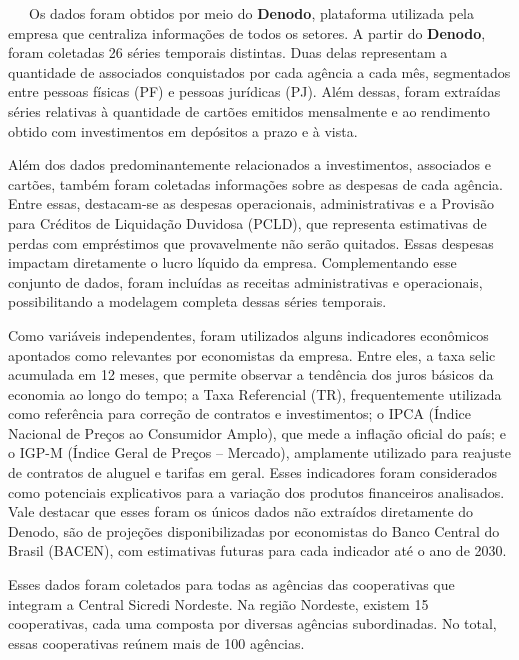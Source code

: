 \documentclass[
  12pt,
  a4paper,
]{scrreprt}
\begin{document}
~~~Os dados foram obtidos por meio do \textbf{Denodo}, plataforma
utilizada pela empresa que centraliza informações de todos os setores. A
partir do \textbf{Denodo}, foram coletadas 26 séries temporais
distintas. Duas delas representam a quantidade de associados
conquistados por cada agência a cada mês, segmentados entre pessoas
físicas (PF) e pessoas jurídicas (PJ). Além dessas, foram extraídas
séries relativas à quantidade de cartões emitidos mensalmente e ao
rendimento obtido com investimentos em depósitos a prazo e à vista.

\vspace{12pt}

Além dos dados predominantemente relacionados a investimentos,
associados e cartões, também foram coletadas informações sobre as
despesas de cada agência. Entre essas, destacam-se as despesas
operacionais, administrativas e a Provisão para Créditos de Liquidação
Duvidosa (PCLD), que representa estimativas de perdas com empréstimos
que provavelmente não serão quitados. Essas despesas impactam
diretamente o lucro líquido da empresa. Complementando esse conjunto de
dados, foram incluídas as receitas administrativas e operacionais,
possibilitando a modelagem completa dessas séries temporais.

\vspace{12pt}

Como variáveis independentes, foram utilizados alguns indicadores
econômicos apontados como relevantes por economistas da empresa. Entre
eles, a taxa selic acumulada em 12 meses, que permite observar a
tendência dos juros básicos da economia ao longo do tempo; a Taxa
Referencial (TR), frequentemente utilizada como referência para correção
de contratos e investimentos; o IPCA (Índice Nacional de Preços ao
Consumidor Amplo), que mede a inflação oficial do país; e o IGP-M
(Índice Geral de Preços -- Mercado), amplamente utilizado para reajuste
de contratos de aluguel e tarifas em geral. Esses indicadores foram
considerados como potenciais explicativos para a variação dos produtos
financeiros analisados. Vale destacar que esses foram os únicos dados
não extraídos diretamente do Denodo, são de projeções disponibilizadas
por economistas do Banco Central do Brasil (BACEN), com estimativas
futuras para cada indicador até o ano de 2030.

\vspace{12pt}

Esses dados foram coletados para todas as agências das cooperativas que
integram a Central Sicredi Nordeste. Na região Nordeste, existem 15
cooperativas, cada uma composta por diversas agências subordinadas. No
total, essas cooperativas reúnem mais de 100 agências.
\end{document}
